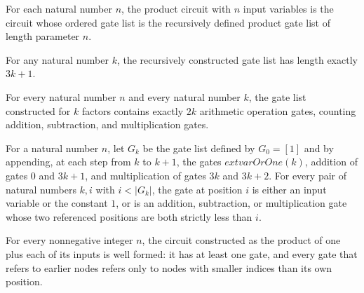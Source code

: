 \begin{definition}
\label{Randomized.AlgCircuit.prodOnePlus}
\leanok
{}
For each natural number $n$, the product circuit with $n$ input variables is the circuit
whose ordered gate list is the recursively defined product gate list of length parameter
$n$.
\end{definition}

\begin{theorem}
\label{Randomized.AlgCircuit.length_prodOnePlusGates}
\leanok
{}
For any natural number $k$, the recursively constructed gate list has length exactly
$3k+1$.
\end{theorem}

\begin{theorem}
\label{Randomized.AlgCircuit.countP_isOp_prodOnePlusGates}
\leanok
{}
For every natural number $n$ and every natural number $k$, the gate list constructed for
$k$ factors contains exactly $2k$ arithmetic operation gates, counting addition,
subtraction, and multiplication gates.
\end{theorem}

\begin{theorem}
\label{Randomized.AlgCircuit.refsBelow_prodOnePlusGates}
\leanok
{}
For a natural number $n$, let $G_k$ be the gate list defined by $G_0=[1]$ and by
appending, at each step from $k$ to $k+1$, the gates $	ext{varOrOne}(k)$, addition of
gates $0$ and $3k+1$, and multiplication of gates $3k$ and $3k+2$. For every pair of
natural numbers $k,i$ with $i<|G_k|$, the gate at position $i$ is either an input
variable or the constant $1$, or is an addition, subtraction, or multiplication gate
whose two referenced positions are both strictly less than $i$.
\end{theorem}

\begin{theorem}
\label{Randomized.AlgCircuit.wellFormed_prodOnePlus}
\leanok
{}
For every nonnegative integer $n$, the circuit constructed as the product of one plus
each of its inputs is well formed: it has at least one gate, and every gate that refers
to earlier nodes refers only to nodes with smaller indices than its own position.
\end{theorem}

